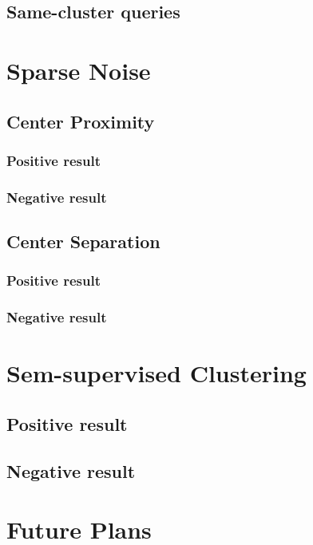 \documentclass[letterpaper,12pt,titlepage,oneside,final]{book}
\begin{document}
\section{Same-cluster queries}


\chapter{Sparse Noise}
\label{ANALYSIS}
\section{Center Proximity}
\subsection{Positive result}
\subsection{Negative result}
\section{Center Separation}
\subsection{Positive result}
\subsection{Negative result}


\chapter{Sem-supervised Clustering}
\label{SSC}
\section{Positive result}
\section{Negative result}


\chapter{Future Plans}
\label{FUTURE}
\end{document}
